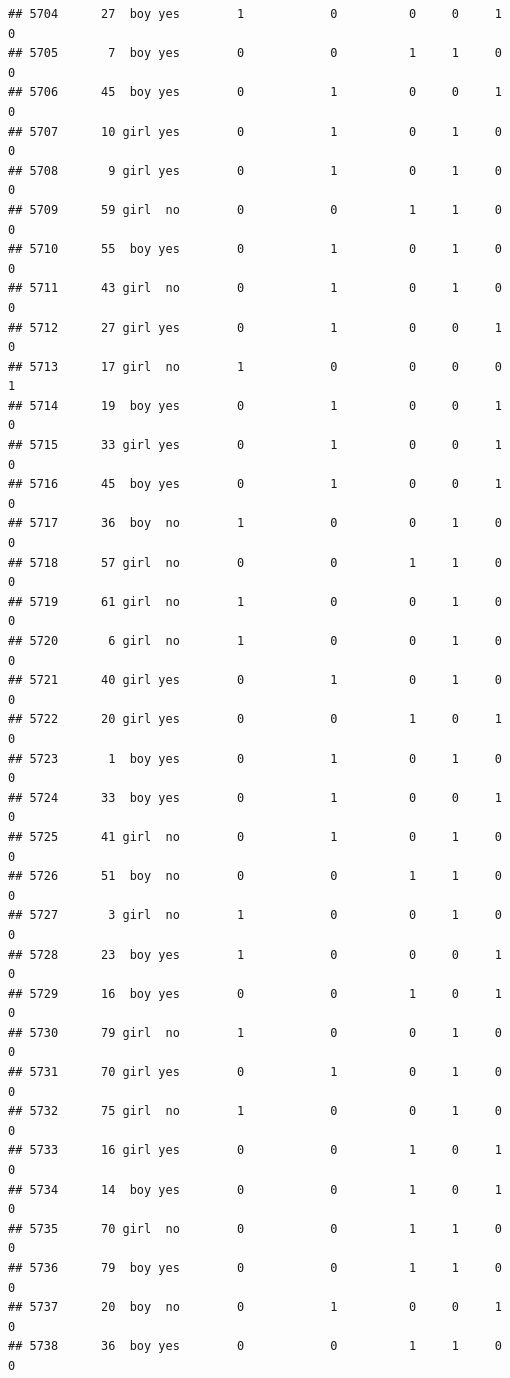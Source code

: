 \documentclass[man]{apa6}
\begin{document}
\begin{verbatim}
## 5704      27  boy yes        1            0          0     0     1     0
## 5705       7  boy yes        0            0          1     1     0     0
## 5706      45  boy yes        0            1          0     0     1     0
## 5707      10 girl yes        0            1          0     1     0     0
## 5708       9 girl yes        0            1          0     1     0     0
## 5709      59 girl  no        0            0          1     1     0     0
## 5710      55  boy yes        0            1          0     1     0     0
## 5711      43 girl  no        0            1          0     1     0     0
## 5712      27 girl yes        0            1          0     0     1     0
## 5713      17 girl  no        1            0          0     0     0     1
## 5714      19  boy yes        0            1          0     0     1     0
## 5715      33 girl yes        0            1          0     0     1     0
## 5716      45  boy yes        0            1          0     0     1     0
## 5717      36  boy  no        1            0          0     1     0     0
## 5718      57 girl  no        0            0          1     1     0     0
## 5719      61 girl  no        1            0          0     1     0     0
## 5720       6 girl  no        1            0          0     1     0     0
## 5721      40 girl yes        0            1          0     1     0     0
## 5722      20 girl yes        0            0          1     0     1     0
## 5723       1  boy yes        0            1          0     1     0     0
## 5724      33  boy yes        0            1          0     0     1     0
## 5725      41 girl  no        0            1          0     1     0     0
## 5726      51  boy  no        0            0          1     1     0     0
## 5727       3 girl  no        1            0          0     1     0     0
## 5728      23  boy yes        1            0          0     0     1     0
## 5729      16  boy yes        0            0          1     0     1     0
## 5730      79 girl  no        1            0          0     1     0     0
## 5731      70 girl yes        0            1          0     1     0     0
## 5732      75 girl  no        1            0          0     1     0     0
## 5733      16 girl yes        0            0          1     0     1     0
## 5734      14  boy yes        0            0          1     0     1     0
## 5735      70 girl  no        0            0          1     1     0     0
## 5736      79  boy yes        0            0          1     1     0     0
## 5737      20  boy  no        0            1          0     0     1     0
## 5738      36  boy yes        0            0          1     1     0     0

\end{verbatim}
\end{document}
